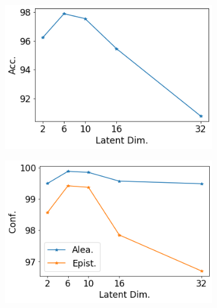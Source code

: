 \begin{figure}[ht]
    \centering
    \begin{subfigure}[t]{0.33 \textwidth}
        \centering
        \includegraphics[width=1. \textwidth]{sections/006_neurips2020/figures/lat_dim_sen_acc.png}
    \end{subfigure}%
    \begin{subfigure}[t]{0.33 \textwidth}
        \centering
        \includegraphics[width=1. \textwidth]{sections/006_neurips2020/figures/lat_dim_sen_conf.png}
    \end{subfigure}%
    

\end{figure}
